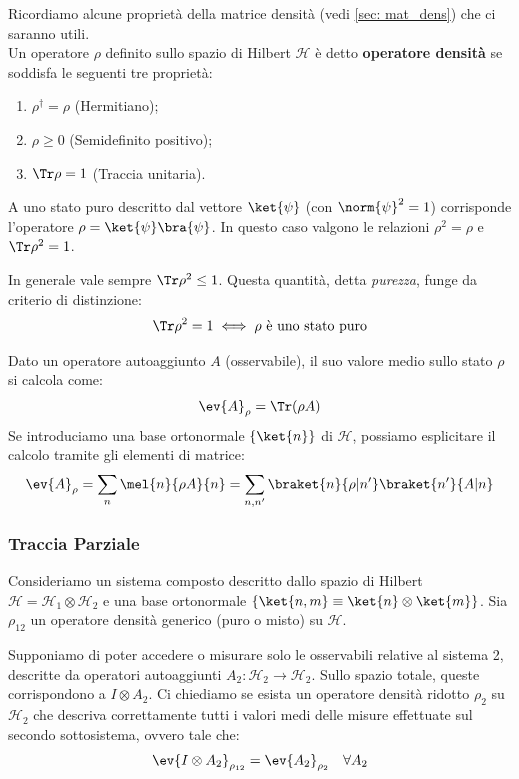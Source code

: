 Ricordiamo alcune proprietà della matrice densità (vedi \ref{sec: mat_dens}) che ci saranno utili. \\Un operatore $\rho$ definito sullo spazio di Hilbert $\mathcal{H}$ è detto \textbf{operatore densità} se soddisfa le seguenti tre proprietà:
\begin{enumerate}
    \item $\rho^\dagger = \rho$ (Hermitiano);
    \item $\rho \geq 0$ (Semidefinito positivo);
    \item $\Tr \rho = 1$ (Traccia unitaria).
\end{enumerate}

A uno stato puro descritto dal vettore $\ket{\psi}$ (con $\norm{\psi}^2=1$) corrisponde l'operatore $\rho = \ket{\psi}\bra{\psi}$.
In questo caso valgono le relazioni $\rho^2 = \rho$ e $\Tr \rho^2 = 1$.

In generale vale sempre $\Tr \rho^2 \leq 1$. Questa quantità, detta \textit{purezza}, funge da criterio di distinzione:
\[
    \Tr \rho^2 = 1 \iff \rho \text{ è uno stato puro}
\]

Dato un operatore autoaggiunto $A$ (osservabile), il suo valore medio sullo stato $\rho$ si calcola come:
\begin{equation}
    \ev{A}_\rho = \Tr(\rho A)
\end{equation}
Se introduciamo una base ortonormale $\{\ket{n}\}$ di $\mathcal{H}$, possiamo esplicitare il calcolo tramite gli elementi di matrice:
\[
    \ev{A}_\rho = \sum_n \mel{n}{\rho A}{n} = \sum_{n,n'} \braket{n}{\rho|n'} \braket{n'}{A|n}
\]




\subsubsection{Traccia Parziale}

Consideriamo un sistema composto descritto dallo spazio di Hilbert \( \mathcal{H} = \mathcal{H}_1 \otimes \mathcal{H}_2 \) e una base ortonormale \( \{\ket{n,m} \equiv \ket{n}\otimes\ket{m}\} \). Sia \( \rho_{12} \) un operatore densità generico (puro o misto) su \( \mathcal{H} \).

Supponiamo di poter accedere o misurare solo le osservabili relative al sistema 2, descritte da operatori autoaggiunti \( A_2: \mathcal{H}_2 \to \mathcal{H}_2 \). Sullo spazio totale, queste corrispondono a \( I \otimes A_2 \).
Ci chiediamo se esista un operatore densità ridotto \( \rho_2 \) su \( \mathcal{H}_2 \) che descriva correttamente tutti i valori medi delle misure effettuate sul secondo sottosistema, ovvero tale che:
\begin{equation}
    \ev{I \otimes A_2}_{\rho_{12}} = \ev{A_2}_{\rho_2} \quad \forall A_2
\end{equation}

